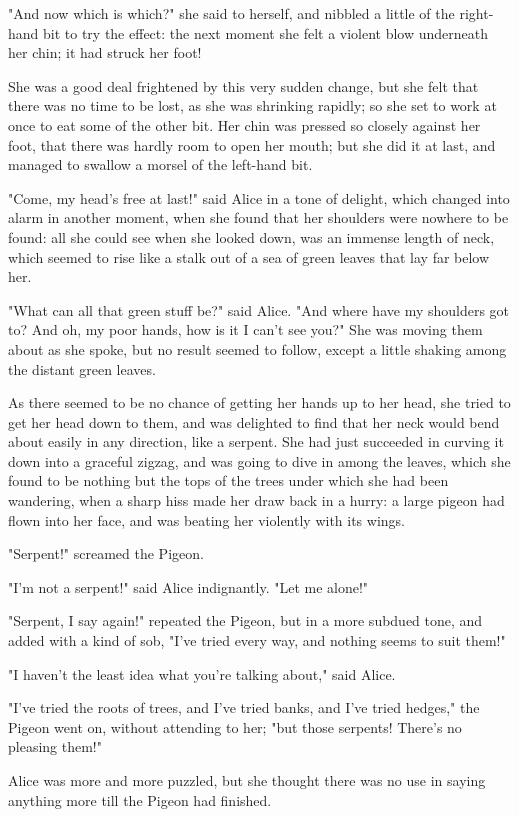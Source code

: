 "And now which is which?" she said to herself, and nibbled a little of the right-hand bit to try the effect: the next moment she felt a violent blow underneath her chin; it had struck her foot!

She was a good deal frightened by this very sudden change, but she felt that there was no time to be lost, as she was shrinking rapidly; so she set to work at once to eat some of the other bit. Her chin was pressed so closely against her foot, that there was hardly room to open her mouth; but she did it at last, and managed to swallow a morsel of the left-hand bit.

​"Come, my head's free at last!" said Alice in a tone of delight, which changed into alarm in another moment, when she found that her shoulders were nowhere to be found: all she could see when she looked down, was an immense length of neck, which seemed to rise like a stalk out of a sea of green leaves that lay far below her.

"What can all that green stuff be?" said Alice. "And where have my shoulders got to? And oh, my poor hands, how is it I can't see you?" She was moving them about as she spoke, but no result seemed to follow, except a little shaking among the distant green leaves.

As there seemed to be no chance of getting her hands up to her head, she tried to get her head down to them, and was delighted to find that her neck would bend about easily in any direction, like a serpent. She had just succeeded in curving it down into a graceful zigzag, and was going to dive in among the leaves, which she found to be nothing but the tops of the trees ​under which she had been wandering, when a sharp hiss made her draw back in a hurry: a large pigeon had flown into her face, and was beating her violently with its wings.

"Serpent!" screamed the Pigeon.

"I'm not a serpent!" said Alice indignantly. "Let me alone!"

"Serpent, I say again!" repeated the Pigeon, but in a more subdued tone, and added with a kind of sob, "I've tried every way, and nothing seems to suit them!"

"I haven't the least idea what you're talking about," said Alice.

"I've tried the roots of trees, and I've tried banks, and I've tried hedges," the Pigeon went on, without attending to her; "but those serpents! There's no pleasing them!"

Alice was more and more puzzled, but she thought there was no use in saying anything more till the Pigeon had finished.

